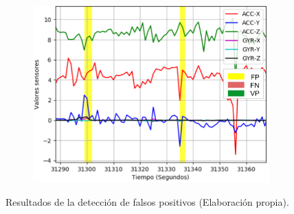 \begin{figure}[H]
{\begin{varwidth}{\textwidth}
\begin{subfigure}[h]{0.45\textwidth}
            \includegraphics[width=\textwidth]{imagenes/Cap5/fp3}
        \end{subfigure} 
        \end{varwidth}}
        \caption{Resultados de la detecci\'{o}n de falsos positivos (Elaboraci\'{o}n propia).}
		\label{fig:resultados_falsos_positivos}
    \end{figure}


 
 